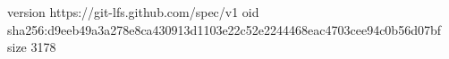 version https://git-lfs.github.com/spec/v1
oid sha256:d9eeb49a3a278e8ca430913d1103e22c52e2244468eac4703cee94c0b56d07bf
size 3178
